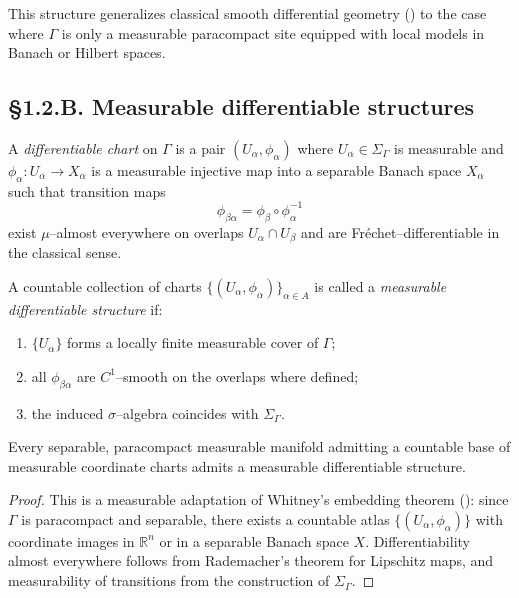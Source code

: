This structure generalizes classical smooth differential geometry (\cite{LeeSmooth, KobayashiNomizu}) to the case where $\Gamma$ is only a measurable paracompact site equipped with local models in Banach or Hilbert spaces.

\subsection*{§1.2.B. Measurable differentiable structures}

\begin{definition}
A \emph{differentiable chart} on $\Gamma$ is a pair $(U_\alpha,\phi_\alpha)$ where $U_\alpha\in\Sigma_\Gamma$ is measurable and $\phi_\alpha:U_\alpha\to X_\alpha$ is a measurable injective map into a separable Banach space $X_\alpha$ such that transition maps 
\[
\phi_{\beta\alpha}=\phi_\beta\circ\phi_\alpha^{-1}
\]
exist $\mu$–almost everywhere on overlaps $U_\alpha\cap U_\beta$ and are Fréchet–differentiable in the classical sense.
\end{definition}

\begin{definition}
A countable collection of charts $\{(U_\alpha,\phi_\alpha)\}_{\alpha\in A}$ is called a \emph{measurable differentiable structure} if:
\begin{enumerate}
  \item $\{U_\alpha\}$ forms a locally finite measurable cover of $\Gamma$;
  \item all $\phi_{\beta\alpha}$ are $C^1$–smooth on the overlaps where defined;
  \item the induced $\sigma$–algebra coincides with $\Sigma_\Gamma$.
\end{enumerate}
\end{definition}

\begin{lemma}\label{lem:1.2.ex}
Every separable, paracompact measurable manifold admitting a countable base of measurable coordinate charts admits a measurable differentiable structure.
\end{lemma}

\begin{proof}
This is a measurable adaptation of Whitney’s embedding theorem (\cite{Whitney1936,Whitney1957}): since $\Gamma$ is paracompact and separable, there exists a countable atlas $\{(U_\alpha,\phi_\alpha)\}$ with coordinate images in $\mathbb R^n$ or in a separable Banach space $X$. Differentiability almost everywhere follows from Rademacher’s theorem for Lipschitz maps, and measurability of transitions from the construction of $\Sigma_\Gamma$.
\end{proof}

